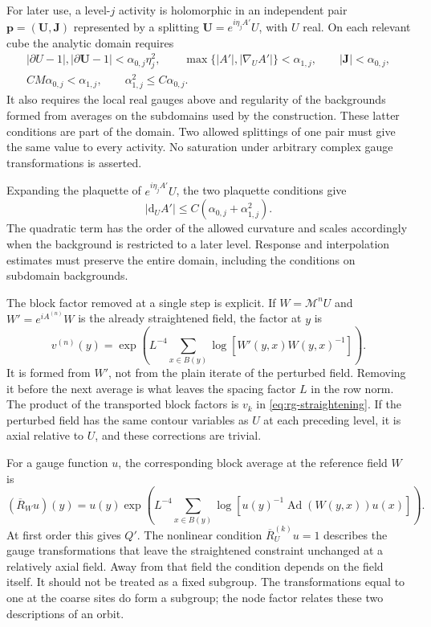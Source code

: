 \documentclass[11pt,letterpaper,reqno]{amsart}
\theoremstyle{definition}
\theoremstyle{remark}
\begin{document}
For later use, a level-$j$ activity is holomorphic in an independent
pair $\mathbf p=(\mathbf U,\mathbf J)$ represented by a splitting
$\mathbf U=e^{i\eta_jA'}U$, with $U$ real. On each relevant cube
the analytic domain requires
\begin{equation}\label{eq:mrg-pair-domain}
 \begin{gathered}
 |\partial U-1|,|\partial\mathbf U-1|
        <\alpha_{0,j}\eta_j^2,\qquad
 \max\{|A'|,|\nabla_UA'|\}<\alpha_{1,j},\qquad
 |\mathbf J|<\alpha_{0,j},\\
 CM\alpha_{0,j}<\alpha_{1,j},\qquad
 \alpha_{1,j}^2\le C\alpha_{0,j}.
 \end{gathered}
\end{equation}
It also requires the local real gauges above and regularity of the
backgrounds formed from averages on the subdomains used by the
construction. These latter conditions are part of the domain.
Two allowed splittings of one pair must give the same value to every
activity. No saturation under arbitrary complex gauge
transformations is asserted.

Expanding the plaquette of $e^{i\eta_jA'}U$, the two plaquette
conditions give
\[
 |\mathrm d_UA'|\le C(\alpha_{0,j}+\alpha_{1,j}^2).
\]
The quadratic term has the order of the allowed curvature and scales
accordingly when the background is restricted to a later level.
Response and interpolation estimates must preserve the entire
domain, including the conditions on subdomain backgrounds.

The block factor removed at a single step is explicit.
If $W=\mathcal M^nU$ and
$W'=e^{iA^{(n)}}W$ is the already straightened field,
the factor at $y$ is
\begin{equation}\label{eq:xrg-block-factor}
 v^{(n)}(y)=\exp\!\left(
 L^{-4}\sum_{x\in B(y)}
       \log[W'(y,x)W(y,x)^{-1}]\right).
\end{equation}
It is formed from $W'$, not from the plain iterate of
the perturbed field. Removing it before the next
average is what leaves the spacing factor $L$ in
the row norm. The product of the transported block
factors is $v_k$ in \eqref{eq:rg-straightening}.
If the perturbed field has the same contour
variables as $U$ at each preceding level, it is
axial relative to $U$, and these corrections are
trivial.

For a gauge function $u$, the corresponding block
average at the reference field $W$ is
\begin{equation}\label{eq:xrg-gauge-average}
 (\overline R_Wu)(y)=u(y)
  \exp\!\left(L^{-4}\sum_{x\in B(y)}
       \log[u(y)^{-1}\operatorname{Ad}(W(y,x))u(x)]\right).
\end{equation}
At first order this gives $Q'$. The nonlinear
condition $\overline R_U^{(k)}u=1$ describes the
gauge transformations that leave the straightened
constraint unchanged at a relatively axial field.
Away from that field the condition depends on the
field itself. It should not be treated as a fixed
subgroup. The transformations equal to one at the
coarse sites do form a subgroup; the node factor
relates these two descriptions of an orbit.
\end{document}
